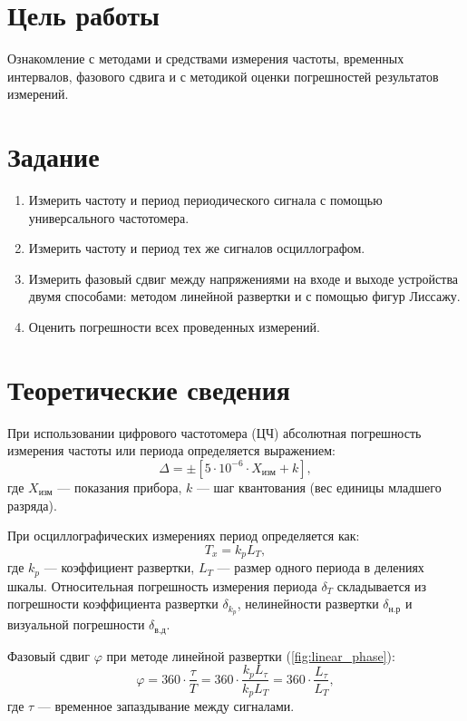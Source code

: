 \section*{Цель работы}
Ознакомление с методами и средствами измерения частоты, временных интервалов, фазового сдвига и с методикой оценки погрешностей результатов измерений.

\section*{Задание}
\begin{enumerate}
    \item Измерить частоту и период периодического сигнала с помощью универсального частотомера.
    \item Измерить частоту и период тех же сигналов осциллографом.
    \item Измерить фазовый сдвиг между напряжениями на входе и выходе устройства двумя способами: методом линейной развертки и с помощью фигур Лиссажу.
    \item Оценить погрешности всех проведенных измерений.
\end{enumerate}

\section*{Теоретические сведения}

При использовании цифрового частотомера (ЦЧ) абсолютная погрешность измерения частоты или периода определяется выражением:
\begin{equation}
    \Delta = \pm [5 \cdot 10^{-6} \cdot X_{\text{изм}} + k],
    \label{eq:err_counter}
\end{equation}
где $X_{\text{изм}}$ — показания прибора, $k$ — шаг квантования (вес единицы младшего разряда).

При осциллографических измерениях период определяется как:
\begin{equation}
    T_x = k_p L_T,
    \label{form:osc_period}
\end{equation}
где $k_p$ — коэффициент развертки, $L_T$ — размер одного периода в делениях шкалы.
Относительная погрешность измерения периода $\delta_T$ складывается из погрешности коэффициента развертки $\delta_{k_p}$, нелинейности развертки $\delta_{\text{н.р}}$ и визуальной погрешности $\delta_{\text{в.д}}$.

Фазовый сдвиг $\varphi$ при методе линейной развертки (\cref{fig:linear_phase}):
\begin{equation}
    \varphi = 360 \cdot \frac{\tau}{T} = 360 \cdot \frac{k_p L_{\tau}}{k_p L_T} = 360 \cdot \frac{L_{\tau}}{L_T},
    \label{eq:phase_linear}
\end{equation}
где $\tau$ — временное запаздывание между сигналами.

